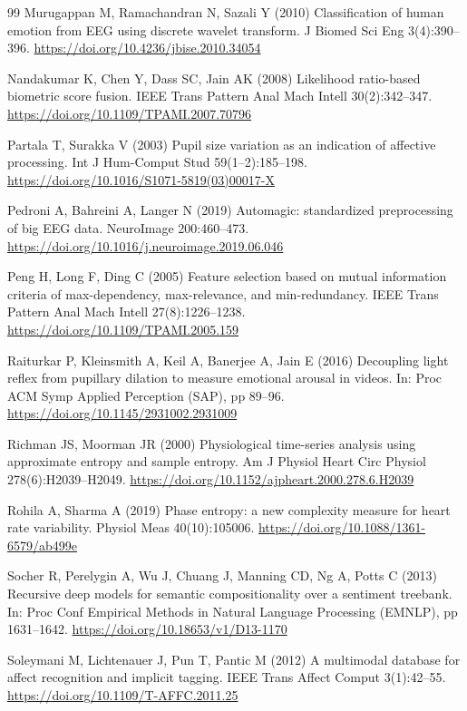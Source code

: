 \begin{thebibliography}{99}
 Murugappan M, Ramachandran N, Sazali Y (2010) Classification of human emotion from EEG using discrete wavelet transform. J Biomed Sci Eng 3(4):390--396. \url{https://doi.org/10.4236/jbise.2010.34054}

 Nandakumar K, Chen Y, Dass SC, Jain AK (2008) Likelihood ratio-based biometric score fusion. IEEE Trans Pattern Anal Mach Intell 30(2):342--347. \url{https://doi.org/10.1109/TPAMI.2007.70796}

 Partala T, Surakka V (2003) Pupil size variation as an indication of affective processing. Int J Hum-Comput Stud 59(1--2):185--198. \url{https://doi.org/10.1016/S1071-5819(03)00017-X}

 Pedroni A, Bahreini A, Langer N (2019) Automagic: standardized preprocessing of big EEG data. NeuroImage 200:460--473. \url{https://doi.org/10.1016/j.neuroimage.2019.06.046}

 Peng H, Long F, Ding C (2005) Feature selection based on mutual information criteria of max-dependency, max-relevance, and min-redundancy. IEEE Trans Pattern Anal Mach Intell 27(8):1226--1238. \url{https://doi.org/10.1109/TPAMI.2005.159}

 Raiturkar P, Kleinsmith A, Keil A, Banerjee A, Jain E (2016) Decoupling light reflex from pupillary dilation to measure emotional arousal in videos. In: Proc ACM Symp Applied Perception (SAP), pp 89--96. \url{https://doi.org/10.1145/2931002.2931009}

 Richman JS, Moorman JR (2000) Physiological time-series analysis using approximate entropy and sample entropy. Am J Physiol Heart Circ Physiol 278(6):H2039--H2049. \url{https://doi.org/10.1152/ajpheart.2000.278.6.H2039}

 Rohila A, Sharma A (2019) Phase entropy: a new complexity measure for heart rate variability. Physiol Meas 40(10):105006. \url{https://doi.org/10.1088/1361-6579/ab499e}

 Socher R, Perelygin A, Wu J, Chuang J, Manning CD, Ng A, Potts C (2013) Recursive deep models for semantic compositionality over a sentiment treebank. In: Proc Conf Empirical Methods in Natural Language Processing (EMNLP), pp 1631--1642. \url{https://doi.org/10.18653/v1/D13-1170}

 Soleymani M, Lichtenauer J, Pun T, Pantic M (2012) A multimodal database for affect recognition and implicit tagging. IEEE Trans Affect Comput 3(1):42--55. \url{https://doi.org/10.1109/T-AFFC.2011.25}


\end{thebibliography}
